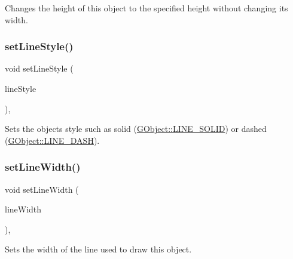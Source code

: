 Changes the height of this object to the specified height without changing its width. 

\mbox{\label{classsgl_1_1GObject_add11575087eb94f1a71faa3f826c6341}} 
\subsubsection{\texorpdfstring{set\+Line\+Style()}{setLineStyle()}}
{\footnotesize\ttfamily void set\+Line\+Style (\begin{DoxyParamCaption}\item[{\mbox{\hyperlink{classsgl_1_1GObject_a86e0f5648542856159bb40775c854aa7}{G\+Object\+::\+Line\+Style}}}]{line\+Style }\end{DoxyParamCaption})\hspace{0.3cm}{\ttfamily [virtual]}, {\ttfamily [inherited]}}



Sets the object\textquotesingle{}s style such as solid (\mbox{\hyperlink{classsgl_1_1GObject_a86e0f5648542856159bb40775c854aa7a700c78bc2cd76acaab26651bf7b4941f}{G\+Object\+::\+L\+I\+N\+E\+\_\+\+S\+O\+L\+ID}}) or dashed (\mbox{\hyperlink{classsgl_1_1GObject_a86e0f5648542856159bb40775c854aa7a9ccba0845f785d81d07b333ae1aad84e}{G\+Object\+::\+L\+I\+N\+E\+\_\+\+D\+A\+SH}}). 

\mbox{\label{classsgl_1_1GObject_afd6a47c6ea6a1f85ca05a65ba3ff3477}} 
\subsubsection{\texorpdfstring{set\+Line\+Width()}{setLineWidth()}}
{\footnotesize\ttfamily void set\+Line\+Width (\begin{DoxyParamCaption}\item[{double}]{line\+Width }\end{DoxyParamCaption})\hspace{0.3cm}{\ttfamily [virtual]}, {\ttfamily [inherited]}}



Sets the width of the line used to draw this object. 

